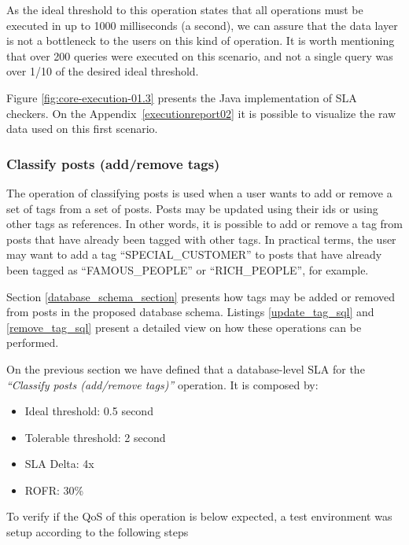 As the ideal threshold to this operation states that all operations must be executed in up to 1000 milliseconds (a second), we can assure that the data layer is not a bottleneck to the users on this kind of operation. It is worth mentioning that over 200 queries were executed on this scenario, and not a single query was over 1/10 of the desired ideal threshold. 

Figure \ref{fig:core-execution-01.3} presents the Java implementation of SLA checkers. On the Appendix~\ref{executionreport02} it is possible to visualize the raw data used on this first scenario. 

\clearpage
\subsubsection{Classify posts (add/remove tags)}

The operation of classifying posts is used when a user wants to add or remove a set of tags from a set of posts. Posts may be updated using their ids or using other tags as references. In other words, it is possible to add or remove a tag from posts that have already been tagged with other tags. In practical terms, the user may want to add a tag ``SPECIAL\_CUSTOMER'' to posts that have already been tagged as ``FAMOUS\_PEOPLE'' or ``RICH\_PEOPLE'', for example. 

Section \ref{database_schema_section} presents how tags may be added or removed from posts in the proposed database schema. Listings \ref{update_tag_sql} and \ref{remove_tag_sql} present a detailed view on how these operations can be performed. 

On the previous section we have defined that a database-level SLA for the \textit{``Classify posts (add/remove tags)''} operation. It is composed by: 

\begin{itemize}
	\item{Ideal threshold: 0.5 second}
	\item{Tolerable threshold: 2 second}
	\item{SLA Delta: 4x}
	\item{ROFR: 30\%}
\end{itemize}

To verify if the QoS of this operation is below expected, a test environment was setup according to the following steps

